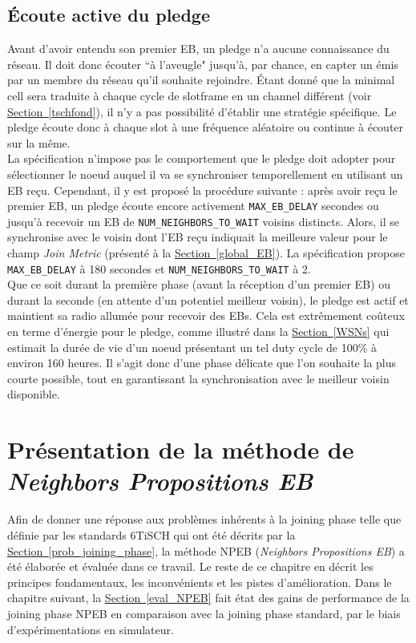 \documentclass[]{report}
\newcommand{\wordlink}[2]{\hyperref[#2]{#1~\ref{#2}}}
\begin{document}
\subsection{Écoute active du pledge}

Avant d'avoir entendu son premier EB, un pledge n'a aucune connaissance du réseau. Il doit donc écouter ``à l'aveugle" jusqu'à, par chance, en capter un émis par un membre du réseau qu'il souhaite rejoindre. Étant donné que la minimal cell sera traduite à chaque cycle de slotframe en un channel différent (voir \wordlink{Section}{tschfond}), il n'y a pas possibilité d'établir une stratégie spécifique. Le pledge écoute donc à chaque slot à une fréquence aléatoire ou continue à écouter sur la même.\\

La spécification \cite{rfc8180} n'impose pas le comportement que le pledge doit adopter pour sélectionner le noeud auquel il va se synchroniser temporellement en utilisant un EB reçu. Cependant, il y est proposé la procédure suivante : après avoir reçu le premier EB, un pledge écoute encore activement \texttt{MAX\_EB\_DELAY} secondes ou jusqu'à recevoir un EB de \texttt{NUM\_NEIGHBORS\_TO\_WAIT} voisins distincts. Alors, il se synchronise avec le voisin dont l'EB reçu indiquait la meilleure valeur pour le champ \textit{Join Metric} (présenté à la \wordlink{Section}{global_EB}). La spécification \cite{rfc8180} propose \texttt{MAX\_EB\_DELAY} à 180 secondes et \texttt{NUM\_NEIGHBORS\_TO\_WAIT} à 2.\\

Que ce soit durant la première phase (avant la réception d'un premier EB) ou durant la seconde (en attente d'un potentiel meilleur voisin), le pledge est actif et maintient sa radio allumée pour recevoir des EBs. Cela est extrêmement coûteux en terme d'énergie pour le pledge, comme illustré dans la \wordlink{Section}{WSNs} qui estimait la durée de vie d'un noeud présentant un tel duty cycle de 100\% à environ 160 heures. Il s'agit donc d'une phase délicate que l'on souhaite la plus courte possible, tout en garantissant la synchronisation avec le meilleur voisin disponible.

\newpage

\section{Présentation de la méthode de \textit{Neighbors Propositions EB}}
\label{intuition_NPEB}

Afin de donner une réponse aux problèmes inhérents à la joining phase telle que définie par les standards 6TiSCH qui ont été décrits par la \wordlink{Section}{prob_joining_phase}, la méthode NPEB (\textit{Neighbors Propositions EB}) a été élaborée et évaluée dans ce travail. Le reste de ce chapitre en décrit les principes fondamentaux, les inconvénients et les pistes d'amélioration. Dans le chapitre suivant, la \wordlink{Section}{eval_NPEB} fait état des gains de performance de la joining phase NPEB en comparaison avec la joining phase standard, par le biais d'expérimentations en simulateur.
\end{document}
